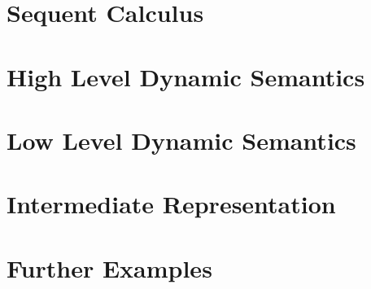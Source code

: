 \chapter{Sequent Calculus}\label{sec:fragment}


\chapter{High Level Dynamic Semantics}\label{sec:hld}


\chapter{Low Level Dynamic Semantics}\label{sec:lld}


\chapter{Intermediate Representation}\label{appendix:vm}

\chapter{Further Examples}

